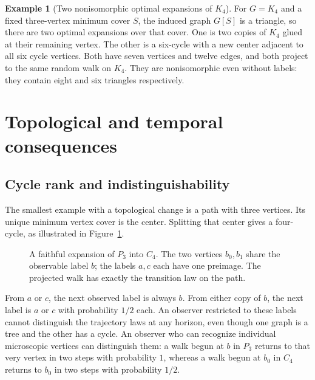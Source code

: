 \documentclass[11pt]{article}
\theoremstyle{definition}
\newtheorem{example}[theorem]{Example}
\numberwithin{equation}{section}
\begin{document}
\begin{example}[Two nonisomorphic optimal expansions of $K_4$]
For $G=K_4$ and a fixed three-vertex minimum cover $S$, the induced graph
$G[S]$ is a triangle, so there are two optimal expansions over that cover.
One is two copies of $K_4$ glued at their remaining vertex. The other is
a six-cycle with a new center adjacent to all six cycle vertices. Both have
seven vertices and twelve edges, and both project to the same random walk
on $K_4$. They are nonisomorphic even without labels: they contain eight
and six triangles respectively.
\end{example}

\section{Topological and temporal consequences}\label{sec:consequences}
\subsection{Cycle rank and indistinguishability}

The smallest example with a topological change is a path with three vertices.
Its unique minimum vertex cover is the center. Splitting that center gives
a four-cycle, as illustrated in Figure~\ref{fig:path-cycle}.

\begin{figure}[htbp]
\centering
{}
\caption{A faithful expansion of $P_3$ into $C_4$. The two vertices
$b_0,b_1$ share the observable label $b$; the labels $a,c$ each have one
preimage. The projected walk has exactly the transition law on the path.}
\label{fig:path-cycle}
\end{figure}

From $a$ or $c$, the next observed label is always $b$. From either copy of
$b$, the next label is $a$ or $c$ with probability $1/2$ each. An observer
restricted to these labels cannot distinguish the trajectory laws at any
horizon, even though one graph is a tree and the other has a cycle. An
observer who can recognize individual microscopic vertices can distinguish
them: a walk begun at $b$ in $P_3$ returns to that very vertex in two steps
with probability $1$, whereas a walk begun at $b_0$ in $C_4$ returns to
$b_0$ in two steps with probability $1/2$.
\end{document}
